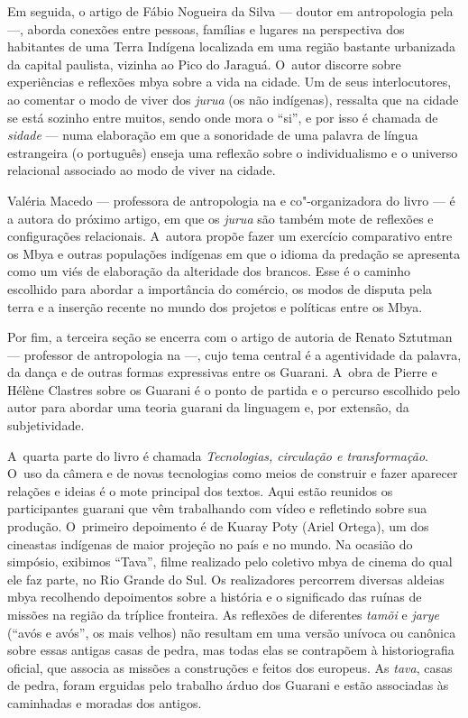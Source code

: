 Em seguida, o artigo de Fábio Nogueira da Silva --- doutor em antropologia
pela  ---, aborda conexões entre pessoas, famílias e lugares na
perspectiva dos habitantes de uma Terra Indígena localizada em uma
região bastante urbanizada da capital paulista, vizinha ao Pico do
Jaraguá. O~autor discorre sobre experiências e reflexões mbya sobre a
vida na cidade. Um de seus interlocutores, ao comentar o modo de viver
dos \emph{jurua} (os não indígenas), ressalta que na cidade se está sozinho
entre muitos, sendo onde mora o ``si'', e por isso é chamada de \emph{sidade} ---
numa elaboração em que a sonoridade de uma palavra de língua
estrangeira (o português) enseja uma reflexão sobre o individualismo e
o universo relacional associado ao modo de viver na cidade.

Valéria Macedo --- professora de antropologia na  e co"-organizadora
do livro --- é a autora do próximo artigo, em que os \emph{jurua} são também
mote de reflexões e configurações relacionais. A~autora propõe fazer um
exercício comparativo entre os Mbya e outras populações indígenas em
que o idioma da predação se apresenta como um viés de elaboração da
alteridade dos brancos. Esse é o caminho escolhido para abordar a
importância do comércio, os modos de disputa pela terra e a inserção
recente no mundo dos projetos e políticas entre os Mbya. 

Por fim, a terceira seção se encerra com o artigo de autoria de Renato
Sztutman --- professor de antropologia na  ---, cujo tema central é a
agentividade da palavra, da dança e de outras formas expressivas entre
os Guarani. A~obra de Pierre e Hélène Clastres sobre os Guarani é o
ponto de partida e o percurso escolhido pelo autor para abordar uma
teoria guarani da linguagem e, por extensão, da subjetividade. 

A~quarta parte do livro é chamada \emph{Tecnologias, circulação e
transformação}. O~uso da câmera e de novas tecnologias como meios de
construir e fazer aparecer relações e ideias é o mote principal dos
textos. Aqui estão reunidos os participantes guarani que vêm
trabalhando com vídeo e refletindo sobre sua produção. O~primeiro
depoimento é de Kuaray Poty (Ariel Ortega), um dos cineastas indígenas
de maior projeção no país e no mundo. Na ocasião do simpósio, exibimos
``Tava'', filme realizado pelo coletivo mbya de cinema do qual ele faz
parte, no Rio Grande do Sul. Os realizadores percorrem diversas aldeias
mbya recolhendo depoimentos sobre a história e o significado das ruínas
de missões na região da tríplice fronteira. As reflexões de diferentes
\emph{tamõi} e \emph{jarye} (``avós e avós'', os mais velhos) não resultam em uma
versão unívoca ou canônica sobre essas antigas casas de pedra, mas
todas elas se contrapõem à historiografia oficial, que associa as
missões a construções e feitos dos europeus. As \emph{tava}, casas de pedra,
foram erguidas pelo trabalho árduo dos Guarani e estão associadas às
caminhadas e moradas dos antigos. 

